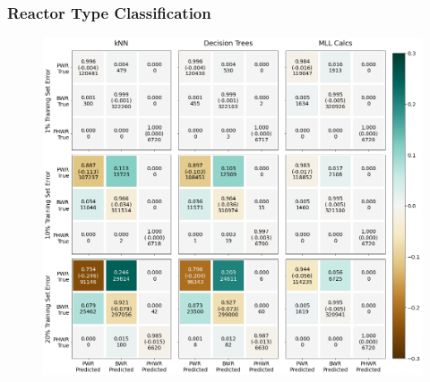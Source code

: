 \begin{frame}
  \frametitle{Reactor Type Classification}
    \begin{figure}
      \centering
      \includegraphics[height=0.85\textheight]{./figures/confusion_matrix_nuc29_3errs.png}
    \end{figure}
\end{frame}

